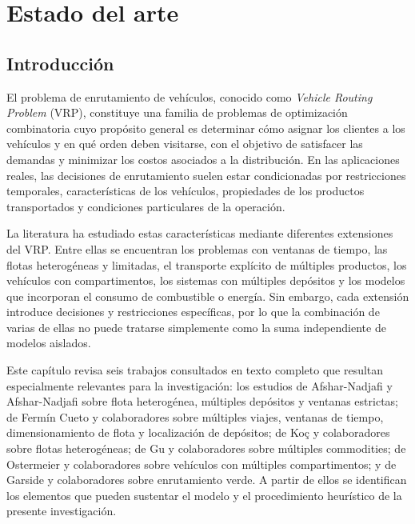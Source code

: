 

\chapter{Estado del arte}
\label{chap:estado_arte}

\section{Introducción}

El problema de enrutamiento de vehículos, conocido como \textit{Vehicle Routing Problem} (VRP), constituye una familia de problemas de optimización combinatoria cuyo propósito general es determinar cómo asignar los clientes a los vehículos y en qué orden deben visitarse, con el objetivo de satisfacer las demandas y minimizar los costos asociados a la distribución. En las aplicaciones reales, las decisiones de enrutamiento suelen estar condicionadas por restricciones temporales, características de los vehículos, propiedades de los productos transportados y condiciones particulares de la operación.

La literatura ha estudiado estas características mediante diferentes extensiones del VRP. Entre ellas se encuentran los problemas con ventanas de tiempo, las flotas heterogéneas y limitadas, el transporte explícito de múltiples productos, los vehículos con compartimentos, los sistemas con múltiples depósitos y los modelos que incorporan el consumo de combustible o energía. Sin embargo, cada extensión introduce decisiones y restricciones específicas, por lo que la combinación de varias de ellas no puede tratarse simplemente como la suma independiente de modelos aislados.

Este capítulo revisa seis trabajos consultados en texto completo que resultan especialmente relevantes para la investigación: los estudios de Afshar-Nadjafi y Afshar-Nadjafi sobre flota heterogénea, múltiples depósitos y ventanas estrictas; de Fermín Cueto y colaboradores sobre múltiples viajes, ventanas de tiempo, dimensionamiento de flota y localización de depósitos; de Ko\c{c} y colaboradores sobre flotas heterogéneas; de Gu y colaboradores sobre múltiples commodities; de Ostermeier y colaboradores sobre vehículos con múltiples compartimentos; y de Garside y colaboradores sobre enrutamiento verde. A partir de ellos se identifican los elementos que pueden sustentar el modelo y el procedimiento heurístico de la presente investigación.

